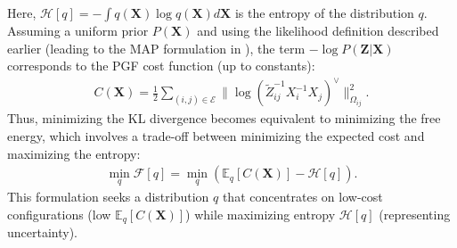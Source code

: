 Here, ${\mathcal{H}}[q] = -\int q({\mathbf{X}}) \log q({\mathbf{X}}) d{\mathbf{X}}$ is the entropy of the distribution $q$. Assuming a uniform prior $P({\mathbf{X}})$ and using the likelihood definition described earlier (leading to the MAP formulation in ), the term $-\log P({\mathbf{Z}} | {\mathbf{X}})$ corresponds to the PGF cost function (up to constants):
\begin{equation}
\begin{aligned}
C({\mathbf{X}}) = \frac{1}{2} \sum_{(i,j) \in {\mathcal{E}}} \| \log({\tilde{Z}}_{ij}^{-1} X_i^{-1} X_j)^{\vee} \|^2_{\Omega_{ij}}.
\label{eq:cost_function_C}
\end{aligned}
\end{equation}
Thus, minimizing the KL divergence becomes equivalent to minimizing the free energy, which involves a trade-off between minimizing the expected cost and maximizing the entropy:
\begin{equation}
\begin{aligned}
\min_q {\mathcal{F}}[q] = \min_q \left( \mathbb{E}_q[C({\mathbf{X}})] - {\mathcal{H}}[q] \right).
\label{eq:kl_min_cost_entropy}
\end{aligned}
\end{equation}
This formulation seeks a distribution $q$ that concentrates on low-cost configurations (low $\mathbb{E}_q[C({\mathbf{X}})]$) while maximizing entropy ${\mathcal{H}}[q]$ (representing uncertainty).

